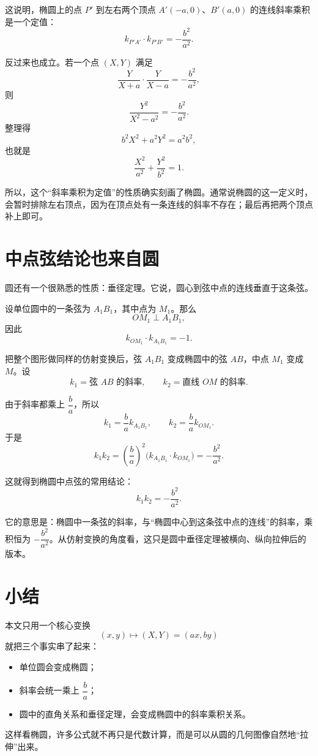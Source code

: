 \documentclass[12pt,a4paper]{ctexart}
\begin{document}
这说明，椭圆上的点 $P'$ 到左右两个顶点 $A'(-a,0)$、$B'(a,0)$ 的连线斜率乘积是一个定值：
\[
\boxed{k_{P'A'}\cdot k_{P'B'}=-\frac{b^2}{a^2}.}
\]

反过来也成立。若一个点 $(X,Y)$ 满足
\[
\frac{Y}{X+a}\cdot\frac{Y}{X-a}=-\frac{b^2}{a^2},
\]
则
\[
\frac{Y^2}{X^2-a^2}=-\frac{b^2}{a^2}.
\]
整理得
\[
b^2X^2+a^2Y^2=a^2b^2,
\]
也就是
\[
\frac{X^2}{a^2}+\frac{Y^2}{b^2}=1.
\]

所以，这个“斜率乘积为定值”的性质确实刻画了椭圆。通常说椭圆的这一定义时，会暂时排除左右顶点，因为在顶点处有一条连线的斜率不存在；最后再把两个顶点补上即可。

\section*{中点弦结论也来自圆}

圆还有一个很熟悉的性质：垂径定理。它说，圆心到弦中点的连线垂直于这条弦。

设单位圆中的一条弦为 $A_1B_1$，其中点为 $M_1$。那么
\[
OM_1\perp A_1B_1,
\]
因此
\[
k_{OM_1}\cdot k_{A_1B_1}=-1.
\]

把整个图形做同样的仿射变换后，弦 $A_1B_1$ 变成椭圆中的弦 $AB$，中点 $M_1$ 变成 $M$。设
\[
k_1=\text{弦 }AB\text{ 的斜率},\qquad
k_2=\text{直线 }OM\text{ 的斜率}.
\]

由于斜率都乘上 $\dfrac{b}{a}$，所以
\[
k_1=\frac{b}{a}k_{A_1B_1},\qquad
k_2=\frac{b}{a}k_{OM_1}.
\]
于是
\[
k_1k_2
=\left(\frac{b}{a}\right)^2
  \bigl(k_{A_1B_1}\cdot k_{OM_1}\bigr)
=-\frac{b^2}{a^2}.
\]

这就得到椭圆中点弦的常用结论：
\[
\boxed{k_1k_2=-\frac{b^2}{a^2}.}
\]

它的意思是：椭圆中一条弦的斜率，与“椭圆中心到这条弦中点的连线”的斜率，乘积恒为 $-\dfrac{b^2}{a^2}$。从仿射变换的角度看，这只是圆中垂径定理被横向、纵向拉伸后的版本。

\section*{小结}

本文只用一个核心变换
\[
(x,y)\longmapsto (X,Y)=(ax,by)
\]
就把三个事实串了起来：
\begin{itemize}
  \item 单位圆会变成椭圆；
  \item 斜率会统一乘上 $\dfrac{b}{a}$；
  \item 圆中的直角关系和垂径定理，会变成椭圆中的斜率乘积关系。
\end{itemize}

这样看椭圆，许多公式就不再只是代数计算，而是可以从圆的几何图像自然地“拉伸”出来。
\end{document}
